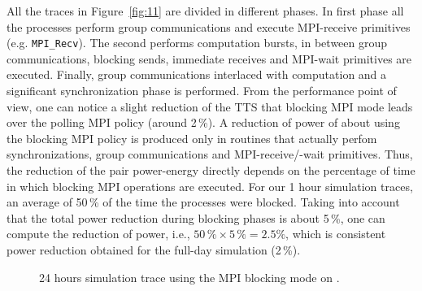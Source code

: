 All the traces in Figure~\ref{fig:11} are divided in different phases. In first phase all the processes perform group communications and execute MPI-receive primitives (e.g. \texttt{MPI\_Recv}). The second performs computation bursts, in between group communications, blocking sends, immediate receives and MPI-wait primitives are executed. Finally, group communications interlaced with computation and a significant synchronization phase is performed. From the performance point of view, one can notice a slight reduction of the TTS that blocking MPI mode leads over the polling MPI policy (around 2\,\%). A reduction of power of about  using the blocking MPI policy is produced only in routines that actually perfom synchronizations, group communications and MPI-receive/-wait primitives. Thus, the reduction of the pair power-energy directly depends on the percentage of time in which blocking MPI operations are executed. For our 1 hour simulation traces, an average of 50\,\% of the time the processes were blocked. Taking into account that  the total power reduction during blocking phases is about 5\,\%, one can compute the reduction of power, i.e., $50\,\% \times 5\,\% = 2.5\%$, which is consistent power reduction obtained for the full-day simulation (2\,\%).

\begin{figure}[ht]
  \centering
  \hspace{0.8cm}
  \scalebox{0.55}{}
  \caption{24 hours simulation trace using the MPI blocking mode on \tinto.}
  \label{fig:9}
\end{figure}





